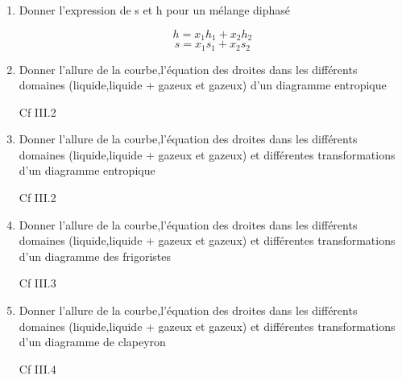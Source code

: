 \begin{enumerate}[label=\arabic{enumi} - , left=0pt, itemsep=1em]
    \item Donner l'expression de s et h pour un mélange diphasé\par
    \begin{solution}
        \[ h = x_1h_1 + x_2h_2\]
        \[ s = x_1s_1 + x_2s_2\]
    \end{solution}

    \item Donner l'allure de la courbe,l'équation des droites dans les différents domaines (liquide,liquide + gazeux et gazeux) d'un diagramme entropique\par
    \begin{solution}
        Cf III.2
    \end{solution}

    \item Donner l'allure de la courbe,l'équation des droites dans les différents domaines (liquide,liquide + gazeux et gazeux) et différentes transformations d'un diagramme entropique\par
    \begin{solution}
        Cf III.2
    \end{solution}

    \item Donner l'allure de la courbe,l'équation des droites dans les différents domaines (liquide,liquide + gazeux et gazeux) et différentes transformations d'un diagramme des frigoristes\par
    \begin{solution}
        Cf III.3
    \end{solution}

    \item Donner l'allure de la courbe,l'équation des droites dans les différents domaines (liquide,liquide + gazeux et gazeux) et différentes transformations d'un diagramme de clapeyron\par
    \begin{solution}
        Cf III.4
    \end{solution}
\end{enumerate}